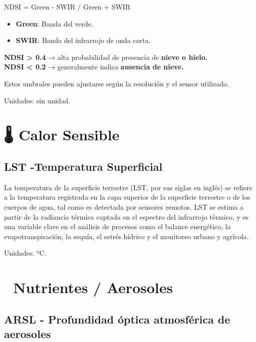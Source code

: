 \documentclass[
]{book}
\providecommand{\tightlist}{%
  \setlength{\itemsep}{0pt}\setlength{\parskip}{0pt}}
\begin{document}
NDSI = Green - SWIR / Green + SWIR\hspace{0pt}

\begin{itemize}
\tightlist
\item
  \textbf{Green}: Banda del verde.\\
\item
  \textbf{SWIR}: Banda del infrarrojo de onda corta.
\end{itemize}

\textbf{NDSI \textgreater{} 0.4} → alta probabilidad de presencia de \textbf{nieve o hielo.}\\
\textbf{NDSI \textless{} 0.2} → generalmente indica \textbf{ausencia de nieve.}

Estos umbrales pueden ajustarse según la resolución y el sensor utilizado.

Unidades: sin unidad.

\section{\texorpdfstring{\textbf{🌡️ Calor Sensible}}{🌡️ Calor Sensible}}\label{calor-sensible}

\subsection{\texorpdfstring{\textbf{LST} -Temperatura Superficial}{LST -Temperatura Superficial}}\label{lst--temperatura-superficial}

La temperatura de la superficie terrestre (LST, por sus siglas en inglés) se refiere a la temperatura registrada en la capa superior de la superficie terrestre o de los cuerpos de agua, tal como es detectada por sensores remotos. LST se estima a partir de la radiancia térmica captada en el espectro del infrarrojo térmico, y es una variable clave en el análisis de procesos como el balance energético, la evapotranspiración, la sequía, el estrés hídrico y el monitoreo urbano y agrícola.

Unidades: ºC.

\section{\texorpdfstring{\textbf{💨 Nutrientes / Aerosoles}}{💨 Nutrientes / Aerosoles}}\label{nutrientes-aerosoles}

\subsection{\texorpdfstring{\textbf{ARSL} - Profundidad óptica atmosférica de aerosoles}{ARSL - Profundidad óptica atmosférica de aerosoles}}\label{arsl---profundidad-uxf3ptica-atmosfuxe9rica-de-aerosoles}
\end{document}
